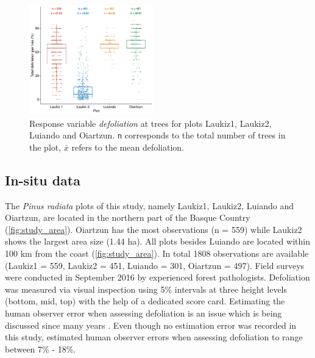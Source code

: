 \documentclass[journal]{IEEEtran}
\begin{document}
\begin{figure} [t!]
	\centering
	\begin{center}
		\includegraphics[width=0.48\textwidth] {defoliation-distribution-plot-1.pdf}
		\caption{Response variable \textit{defoliation} at trees for plots Laukiz1, Laukiz2, Luiando and Oiartzun. \texttt{n} corresponds to the total number of trees in the plot, $\bar{x}$ refers to the mean defoliation.}\label{fig:defol-distr}
	\end{center}
\end{figure}

\subsection{In-situ data}

The \textit{Pinus radiata} plots of this study, namely Laukiz1, Laukiz2, Luiando and Oiartzun, are located in the northern part of the Basque Country (\autoref{fig:study_area}).
Oiartzun has the most observations (n = 559) while Laukiz2 shows the largest area size (1.44 ha).
All plots besides Luiando are located within 100 km from the coast (\autoref{fig:study_area}).
In total 1808 observations are available (Laukiz1 = 559, Laukiz2 = 451, Luiando = 301, Oiartzun = 497).
Field surveys were conducted in September 2016 by experienced forest pathologists.
Defoliation was measured via visual inspection using 5\% intervals at three height levels (bottom, mid, top) with the help of a dedicated score card.
Estimating the human observer error when assessing defoliation is an issue which is being discussed since many years \cite{innes1993}.
Even though no estimation error was recorded in this study, \cite{maclean1982} estimated human observer errors when assessing defoliation to range between 7\% - 18\%.
\end{document}
